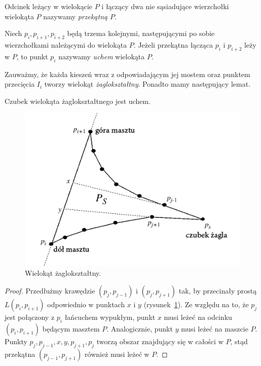 \begin{definicja}
  Odcinek leżący w wielokącie $P$ i łączący dwa nie sąsiadujące
  wierzchołki wielokąta $P$ nazywamy \emph{przekątną} $P$.
\end{definicja}

\begin{definicja}\label{def:ear}
  Niech $p_i, p_{i+1}, p_{i+2}$ będą trzema kolejnymi, następującymi
  po sobie wierzchołkami należącymi do wielokąta $P$. Jeżeli przekątna
  łącząca $p_{i}$ i $p_{i+2}$ leży w $P$, to punkt $p_i$ nazywamy
  \emph{uchem} wielokąta $P$.
\end{definicja}

Zauważmy, że każda kieszeń wraz z odpowiadającym jej mostem oraz
punktem przecięcia $I_i$ tworzy wielokąt
\emph{żaglokształtny}. Ponadto mamy następujący lemat.

\begin{lemat}\label{lem:sailtip}\emph{\cite{ToussaintInt}}
  Czubek wielokąta żaglokształtnego jest uchem.
\end{lemat}

\begin{figure}[htb]
  \centering
  \includegraphics[scale=0.7]{img/toussaint3}
  \caption{\label{img:toussaint3} Wielokąt żaglokształtny.}
\end{figure}

\begin{proof}
  Przedłużmy krawędzie $(p_j,p_{j-1})$ i $(p_j, p_{j+1})$ tak, by
  przecinały prostą $L(p_i, p_{i+1})$ odpowiednio w punktach $x$ i $y$
  (rysunek~\ref{img:toussaint3}). Ze względu na to, że $p_j$ jest
  połączony z $p_i$ łańcuchem wypukłym, punkt $x$ musi leżeć na
  odcinku $(p_i, p_{i+1})$ będącym masztem $P$. Analogicznie, punkt
  $y$ musi leżeć na maszcie $P$. Punkty $p_j, p_{j-1}, x, y, p_{j+1},
  p_j$ tworzą obszar znajdujący się w całości w $P$, stąd przekątna
  $(p_{j-1}, p_{j+1})$ również musi leżeć w $P$.
\end{proof}

